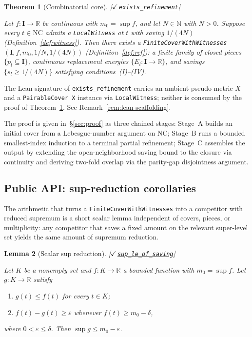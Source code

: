 \documentclass[11pt,reqno]{amsart}
\newtheorem{theorem}{Theorem}[section]
\newtheorem{lemma}[theorem]{Lemma}
\theoremstyle{definition}
\newcommand{\unit}{\mathbf{I}}
\newcommand{\NC}{\mathrm{NC}}
\newcommand{\leanrepo}{https://github.com/MathNetwork/comb_arg/blob/v0.1.0/CombArg}
\newcommand{\leanmargin}[2]{%
  \nopagebreak\hfill{\normalfont\small\color{leangreen}%
    [\ensuremath{\checkmark}\,\href{\leanrepo/#2}{\texttt{#1}}]}\par\nopagebreak
}
\begin{document}
\begin{theorem}[Combinatorial core]
\label{thm:core}
\leanmargin{exists\_refinement}{Refinement/Assembly.lean}
Let $f : \unit \to \mathbb{R}$ be continuous with
$m_0 = \sup f$, and let $N \in \mathbb{N}$ with $N > 0$.
Suppose every $t \in \NC$ admits a \texttt{LocalWitness} at $t$
with saving $1/(4N)$ (Definition~\ref{def:witness}). Then there
exists a
\texttt{FiniteCoverWithWitnesses}$(\unit, f, m_0, 1/N, 1/(4N))$
(Definition~\ref{def:ref}): a finite family of closed pieces
$\{p_l \subseteq \unit\}$, continuous replacement energies
$\{E_l : \unit \to \mathbb{R}\}$, and savings
$\{s_l \ge 1/(4N)\}$ satisfying conditions~(I)--(IV).
\end{theorem}

The Lean signature of \texttt{exists\_refinement} carries an
ambient pseudo-metric $X$ and a \texttt{PairableCover X}
instance via \texttt{LocalWitness}; neither is consumed by the
proof of Theorem~\ref{thm:core}. See
Remark~\ref{rem:lean-scaffolding}.

The proof is given in~\S\ref{sec:proof} as three chained stages:
Stage~A builds an initial cover from a Lebesgue-number argument
on $\NC$; Stage~B runs a bounded smallest-index induction to a
terminal partial refinement; Stage~C assembles the output by
extending the open-neighborhood saving bound to the closure via
continuity and deriving two-fold overlap via the parity-gap
disjointness argument.

\subsection{Public API: sup-reduction corollaries}
\label{sec:app-spec}

The arithmetic that turns a
\texttt{Finite\discretionary{-}{}{}Cover\discretionary{-}{}{}With\discretionary{-}{}{}Witnesses}
into a competitor with reduced supremum is a short scalar lemma
independent of covers, pieces, or multiplicity: any competitor
that saves a fixed amount on the relevant super-level set yields
the same amount of supremum reduction.

\begin{lemma}[Scalar sup reduction]
\label{lem:scalar-sup-reduction}
\leanmargin{sup\_le\_of\_saving}{Core.lean}
Let $K$ be a nonempty set and $f : K \to \mathbb{R}$ a bounded
function with $m_0 = \sup f$. Let $g : K \to \mathbb{R}$ satisfy
\begin{enumerate}
\item[(i)] $g(t) \le f(t)$ for every $t \in K$;
\item[(ii)] $f(t) - g(t) \ge \varepsilon$ whenever
      $f(t) \ge m_0 - \delta$,
\end{enumerate}
where $0 < \varepsilon \le \delta$. Then
$\sup g \le m_0 - \varepsilon$.
\end{lemma}
\end{document}
